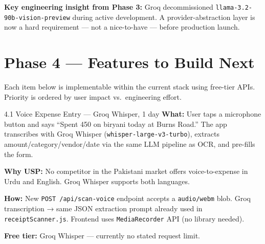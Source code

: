 \documentclass[11pt,a4paper]{article}
\begin{document}
\begin{findingbox}
\textbf{Key engineering insight from Phase 3:}
Groq decommissioned \texttt{llama-3.2-90b-vision-preview} during active development.
A provider-abstraction layer is now a hard requirement — not a nice-to-have — before production launch.
\end{findingbox}

\section{Phase 4 — Features to Build Next}

Each item below is implementable within the current stack using free-tier APIs.
Priority is ordered by user impact vs.\ engineering effort.

\begin{featurebox}{4.1 \quad Voice Expense Entry \textnormal{\small — Groq Whisper, 1 day}}
\textbf{What:} User taps a microphone button and says
``Spent 450 on biryani today at Burns Road.''
The app transcribes with Groq Whisper (\texttt{whisper-large-v3-turbo}),
extracts amount/category/vendor/date via the same LLM pipeline as OCR,
and pre-fills the form.

\textbf{Why USP:} No competitor in the Pakistani market offers voice-to-expense
in Urdu and English. Groq Whisper supports both languages.

\textbf{How:} New \texttt{POST /api/scan-voice} endpoint accepts a
\texttt{audio/webm} blob. Groq transcription → same JSON extraction prompt
already used in \texttt{receiptScanner.js}. Frontend uses
\texttt{MediaRecorder} API (no library needed).

\textbf{Free tier:} Groq Whisper — currently no stated request limit.
\end{featurebox}

\vspace{6pt}
\end{document}

